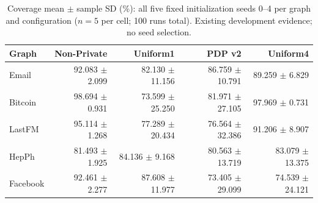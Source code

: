 \begin{table}[htbp]
\centering\small
\caption{Coverage mean $\pm$ sample SD (\%): all five fixed initialization seeds 0--4 per graph and configuration ($n=5$ per cell; 100 runs total). Existing development evidence; no seed selection.}\label{tab:coveragefull}
\begin{tabular}{lrrrr}
\toprule
Graph & Non-Private & Uniform1 & PDP v2 & Uniform4\\ \midrule
Email & 92.083 $\pm$ 2.099 & 82.130 $\pm$ 11.156 & 86.759 $\pm$ 10.791 & 89.259 $\pm$ 6.829 \\
Bitcoin & 98.694 $\pm$ 0.931 & 73.599 $\pm$ 25.250 & 81.971 $\pm$ 27.105 & 97.969 $\pm$ 0.731 \\
LastFM & 95.114 $\pm$ 1.268 & 77.289 $\pm$ 20.434 & 76.564 $\pm$ 32.386 & 91.206 $\pm$ 8.907 \\
HepPh & 81.493 $\pm$ 1.925 & 84.136 $\pm$ 9.168 & 80.563 $\pm$ 13.719 & 83.079 $\pm$ 13.375 \\
Facebook & 92.461 $\pm$ 2.277 & 87.608 $\pm$ 11.977 & 73.405 $\pm$ 29.099 & 74.539 $\pm$ 24.121 \\
\bottomrule\end{tabular}
\end{table}
